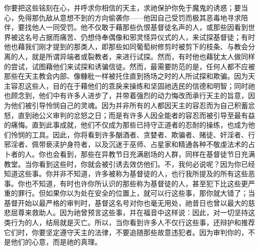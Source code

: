 你要把这些铭刻在心，并呼求你相信的天主，求祂保护你免于魔鬼的诱惑；要当心，免得那仇敌从意想不到的方向偷袭你——他因自己受罚而极其恶毒地寻求陪伴，要找他人一同受罚。他不仅敢于藉那些仇恨基督徒名声的人，或那些因看到世界被这名号占据而痛苦、仍想侍奉偶像和邪灵怪异仪式的人，来试探基督徒；有时他也藉我们刚才提到的那类人，即那些如同葡萄树修剪时被剪下的枝条、与教会分离的人，就是所谓异端者或裂教者，来进行试探。然而，有时他也藉犹太人做同样的尝试，试图藉他们来试探和诱骗信徒。然而，最需要防范的是，任何人都不应被那些在天主教会内部、像糠秕一样被托住直到扬场之时的人所试探和欺骗。因为天主容忍这些人，目的在于藉他们的乖戾来操练和坚固祂选民的信德和明智；同时祂也顾念到，他们中有许多人进步了，并带着强烈的动力悔改而承行天主的旨意，因为他们被引导怜悯自己的灵魂。因为并非所有的人都因天主的容忍而为自己积蓄忿怒，直到祂公义审判的忿怒之日；而是有许多人因全能者的容忍而被引导至最有益的痛悔。直到此事成就，他们不仅成为那些已持守正道者的忍耐的操练，也成为他们怜悯的工具。因此，你将看到许多酗酒者、贪婪者、欺骗者、赌徒、奸淫者、行邪淫者、佩带亵渎护身符者，以及沉迷于巫师、占星家和精通各种不敬虔法术的占卜者的人。你也会看到，那些在异教节日充满剧场的人群，同样在基督徒节日充满教堂。当你看到这些时，你就会被引诱去效仿他们。不，我何必说呢？因为你已经知道这些事。你并非不知道，许多被称为基督徒的人，也行我所提及的所有这些恶事。你也不知道，有时也许你所认识的那些称为基督徒的人，甚至犯下比这些更严重的罪行。但如果你以为处在安全的位置上，就可以行这些事，那你就大错了；当基督开始以最严格的审判时，基督这名号对你也毫无用处，祂昔日也曾以最大的慈悲屈尊来救助人。因为祂曾预言这些事，并在福音中这样说：因此，对一切坚持这类行为的人，结局就是灭亡。所以，当你看到许多人不仅行这些事，还辩护和推荐它们时，你要坚定遵守天主的法律，不要追随那些故意违犯者。因为审判你的，不是他们的心意，而是祂的真理。\par

\par

